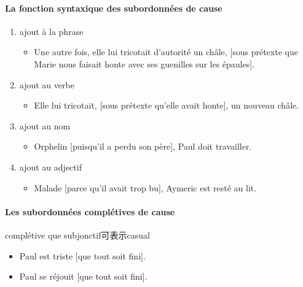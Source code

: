 \documentclass[UTF8]{report}
\begin{document}
\paragraph{La fonction syntaxique des subordonnées de cause}
\begin{enumerate}
    \item ajout à la phrase
    \begin{itemize}
        \item Une autre fois, elle lui tricotait d’autorité un châle, [sous prétexte que Marie nous faisait honte avec ses guenilles sur les épaules].
    \end{itemize}
    \item ajout au verbe
    \begin{itemize}
        \item Elle lui tricotait, [sous prétexte qu’elle avait honte], un nouveau châle.
    \end{itemize}
    \item ajout au nom 
    \begin{itemize}
        \item Orphelin [puisqu’il a perdu son père], Paul doit travailler.
    \end{itemize}
    \item ajout au adjectif 
    \begin{itemize}
        \item Malade [parce qu’il avait trop bu], Aymeric est resté au lit.
    \end{itemize}
\end{enumerate}

\paragraph{Les subordonnées complétives de cause}
complétive que subjonctif可表示casual
\begin{itemize}
    \item Paul est triste [que tout soit fini].
    \item Paul se réjouit [que tout soit fini].
\end{itemize}
\end{document}
